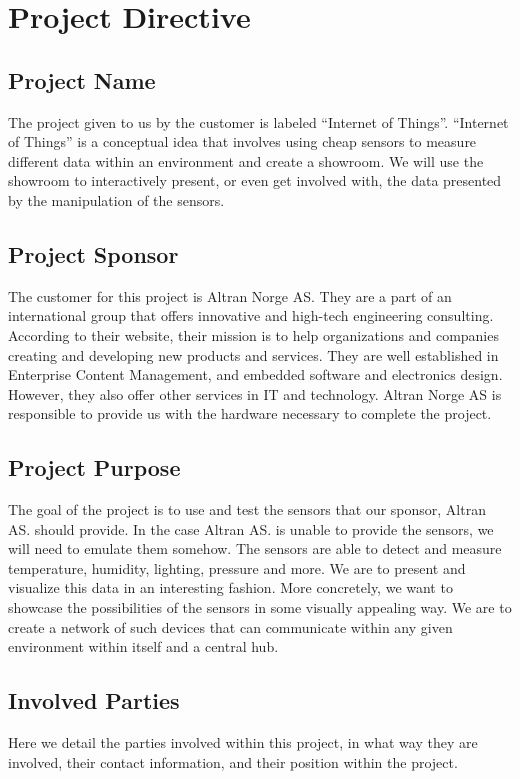 \documentclass[../document.tex]{subfiles}
\begin{document}
\section{Project Directive}

\subsection{Project Name}
The project given to us by the customer is labeled “Internet of Things”. “Internet of Things” is a conceptual idea that involves using cheap sensors to measure different data within an environment and create a showroom. We will use the showroom to interactively present, or even get involved with, the data presented by the manipulation of the sensors.

\subsection{Project Sponsor}
The customer for this project is Altran Norge AS. They are a part of an international group that offers innovative and high-tech engineering consulting. According to their website, their mission is to help organizations and companies creating and developing new products and services. They are well established in Enterprise Content Management, and embedded software and electronics design. However, they also offer other services in IT and technology. Altran Norge AS is responsible to provide us with the hardware necessary to complete the project.

\subsection{Project Purpose}
The goal of the project is to use and test the sensors that our sponsor, Altran AS. should provide. In the case Altran AS. is unable to provide the sensors, we will need to emulate them somehow. The sensors are able to detect and measure temperature, humidity, lighting, pressure and more. We are to present and visualize this data in an interesting fashion. More concretely, we want to showcase the possibilities of the sensors in some visually appealing way. We are to create a network of such devices that can communicate within any given environment within itself and a central hub.

\subsection{Involved Parties}
Here we detail the parties involved within this project, in what way they are involved, their contact information, and their position within the project.
\end{document}
